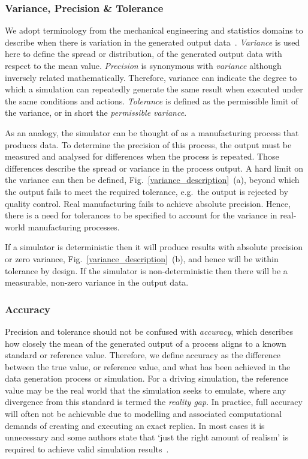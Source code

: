 \subsubsection{Variance, Precision \& Tolerance}
We adopt terminology from the mechanical engineering and statistics domains to describe when there is variation in the generated output data~\cite{ADictionaryofMechanicalEngineering}. \textit{Variance} is used here to define the spread or distribution, of the generated output data with respect to the mean value. \textit{Precision} is synonymous with \textit{variance} although inversely related mathematically. Therefore, variance can indicate the degree to which a simulation can repeatedly generate the same result when executed under the same conditions and actions. \textit{Tolerance} is defined as the permissible limit of the variance, or in short the \textit{permissible variance}. 

As an analogy, the simulator can be thought of as a manufacturing process that produces data. To determine the precision of this process, the output must be measured and analysed for differences when the process is repeated. Those differences describe the spread or variance in the process output. A hard limit on the variance can then be defined, Fig.~\ref{variance_description}~(a), beyond which the output fails to meet the required tolerance, e.g.\ the output is rejected by quality control. Real manufacturing fails to achieve absolute precision. Hence, there is a need for tolerances to be specified to account for the variance in real-world manufacturing processes. 

If a simulator is deterministic then it will produce results with absolute precision or zero variance, Fig.~\ref{variance_description}~(b), and hence will be within tolerance by design. If the simulator is non-deterministic then there will be a measurable, non-zero variance in the output data.\\
%

\subsubsection{Accuracy}
Precision and tolerance should not be confused with \textit{accuracy}, which describes how closely the mean of the generated output of a process aligns to a known standard or reference value. Therefore, we define accuracy as the difference between the true value, or reference value, and what has been achieved in the data generation process or simulation. 
%
For a driving simulation, the reference value may be the real world that the simulation seeks to emulate, where any divergence from this standard is termed the \textit{reality gap}. 
%
In practice, full accuracy will often not be achievable due to modelling and associated computational demands of creating and executing an exact replica. In most cases it is unnecessary and some authors state that `just the right amount of realism' is required to achieve valid simulation results~\cite{Koopman2018}. \\


